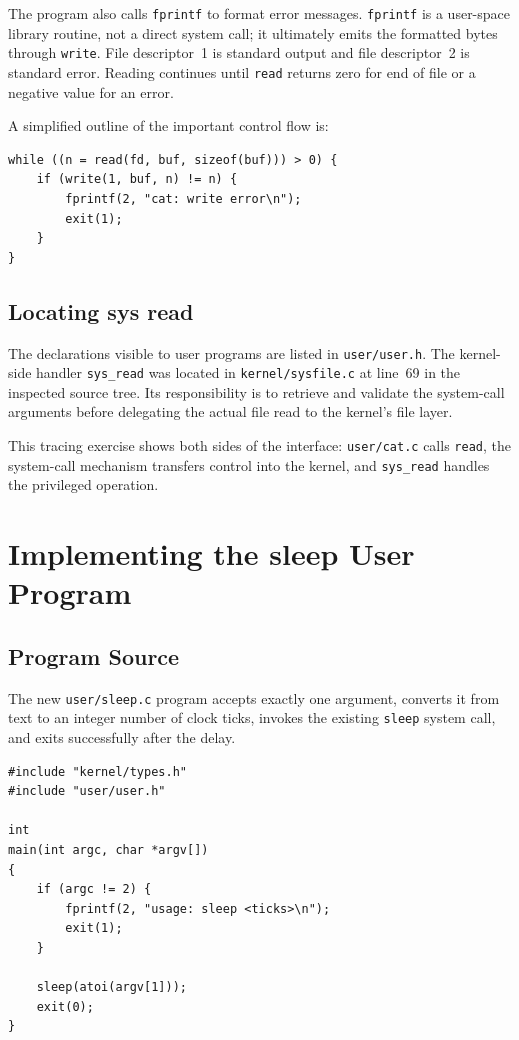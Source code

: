 \documentclass[12pt]{article}
\newcommand{\commandname}[1]{\texttt{#1}}
\begin{document}
The program also calls \commandname{fprintf} to format error messages. \commandname{fprintf} is a user-space library routine, not a direct system call; it ultimately emits the formatted bytes through \commandname{write}. File descriptor~1 is standard output and file descriptor~2 is standard error. Reading continues until \commandname{read} returns zero for end of file or a negative value for an error.

A simplified outline of the important control flow is:

\begin{lstlisting}
while ((n = read(fd, buf, sizeof(buf))) > 0) {
    if (write(1, buf, n) != n) {
        fprintf(2, "cat: write error\n");
        exit(1);
    }
}
\end{lstlisting}

\subsection{Locating sys read}

The declarations visible to user programs are listed in \commandname{user/user.h}. The kernel-side handler \commandname{sys\_read} was located in \commandname{kernel/sysfile.c} at line~69 in the inspected source tree. Its responsibility is to retrieve and validate the system-call arguments before delegating the actual file read to the kernel's file layer.

This tracing exercise shows both sides of the interface: \commandname{user/cat.c} calls \commandname{read}, the system-call mechanism transfers control into the kernel, and \commandname{sys\_read} handles the privileged operation.

\section{Implementing the sleep User Program}

\subsection{Program Source}

The new \commandname{user/sleep.c} program accepts exactly one argument, converts it from text to an integer number of clock ticks, invokes the existing \commandname{sleep} system call, and exits successfully after the delay.

\begin{lstlisting}[caption={Implementation of user/sleep.c}]
#include "kernel/types.h"
#include "user/user.h"

int
main(int argc, char *argv[])
{
    if (argc != 2) {
        fprintf(2, "usage: sleep <ticks>\n");
        exit(1);
    }

    sleep(atoi(argv[1]));
    exit(0);
}
\end{lstlisting}
\end{document}
